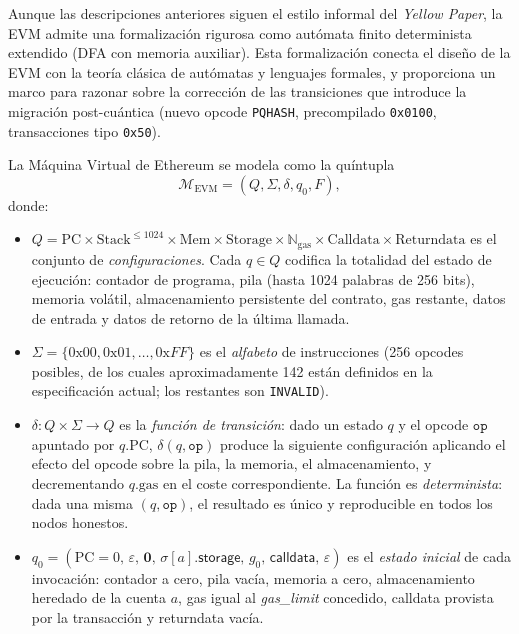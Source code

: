Aunque las descripciones anteriores siguen el estilo informal del \emph{Yellow Paper}, la EVM admite una formalización rigurosa como autómata finito determinista extendido (DFA con memoria auxiliar). Esta formalización conecta el diseño de la EVM con la teoría clásica de autómatas y lenguajes formales, y proporciona un marco para razonar sobre la corrección de las transiciones que introduce la migración post-cuántica (nuevo opcode \texttt{PQHASH}, precompilado \texttt{0x0100}, transacciones tipo \texttt{0x50}).

\begin{definicion}
\label{def:evm_fsm}
La Máquina Virtual de Ethereum se modela como la quíntupla
\begin{equation}
  \mathcal{M}_{\text{EVM}} = (Q, \Sigma, \delta, q_0, F),
  \label{eq:evm_dfa}
\end{equation}
donde:
\begin{itemize}
  \item $Q = \text{PC} \times \text{Stack}^{\leq 1024} \times \text{Mem} \times \text{Storage} \times \mathbb{N}_{\text{gas}} \times \text{Calldata} \times \text{Returndata}$ es el conjunto de \emph{configuraciones}. Cada $q \in Q$ codifica la totalidad del estado de ejecución: contador de programa, pila (hasta 1024 palabras de 256 bits), memoria volátil, almacenamiento persistente del contrato, gas restante, datos de entrada y datos de retorno de la última llamada.
  \item $\Sigma = \{0\text{x}00, 0\text{x}01, \ldots, 0\text{x}FF\}$ es el \emph{alfabeto} de instrucciones (256 opcodes posibles, de los cuales aproximadamente 142 están definidos en la especificación actual; los restantes son \texttt{INVALID}).
  \item $\delta : Q \times \Sigma \to Q$ es la \emph{función de transición}: dado un estado $q$ y el opcode $\texttt{op}$ apuntado por $q.\text{PC}$, $\delta(q, \texttt{op})$ produce la siguiente configuración aplicando el efecto del opcode sobre la pila, la memoria, el almacenamiento, y decrementando $q.\text{gas}$ en el coste correspondiente. La función es \emph{determinista}: dada una misma $(q, \texttt{op})$, el resultado es único y reproducible en todos los nodos honestos.
  \item $q_0 = (\text{PC}=0,\, \varepsilon,\, \mathbf{0},\, \sigma[a].\textsf{storage},\, g_0,\, \textsf{calldata},\, \varepsilon)$ es el \emph{estado inicial} de cada invocación: contador a cero, pila vacía, memoria a cero, almacenamiento heredado de la cuenta $a$, gas igual al \emph{gas\_limit} concedido, calldata provista por la transacción y returndata vacía.

\end{itemize}
\end{definicion}
